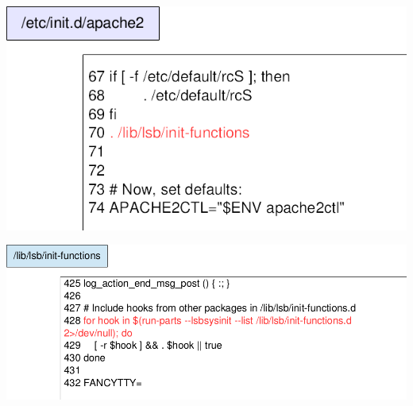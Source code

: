%
%
%
%
%
%
%
%
%
%
%
%
%
%
%
%
\begin{frame}
\begin{center}
\includegraphics[width=0.8\hsize]{image201510/daemonscript0.png}
\end{center}
\end{frame}

\begin{frame}
\begin{center}
\includegraphics[width=1\hsize]{image201510/daemonscript1.png}
\end{center}
\end{frame}

